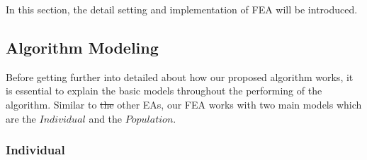 \documentclass[final]{elsarticle}
\begin{document}
In this section, the detail setting and implementation of FEA will be introduced.

\subsection{Algorithm Modeling}

Before getting further into detailed about how our proposed algorithm works, it is essential to explain the basic models throughout the performing of the algorithm. Similar to \sout{the} other EAs, our FEA works with two main models which are the $ Individual $ and the $ Population $.

\subsubsection{Individual}
\end{document}
